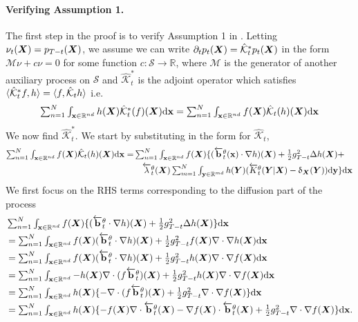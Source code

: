 \paragraph{Verifying Assumption 1.} The first step in the proof is to verify Assumption 1 in
\cite{benton2022denoising}. Letting $\nu_t({\bm{X}}) = p_{T-t}({\bm{X}})$, we assume we can
write $\partial_t p_t ({\bm{X}}) = \hat{\mathcal{K}}_t^* p_t({\bm{X}})$ in the form
$\mathcal{M}\nu + c \nu = 0$ for some function
$c : \mathcal{S} \rightarrow \mathbb{R}$, where $\mathcal{M}$ is the generator
of another auxiliary process on $\mathcal{S}$ and $\hat{\mathcal{K}}_t^*$ is the
adjoint operator which satisfies
$\langle \hat{\mathcal{K}}^*_t f, h \rangle = \langle f, \hat{\mathcal{K}}_t h \rangle$ i.e.
\begin{equation}
  \textstyle   \sum_{n=1}^N \int_{{\mathbf{x}} \in \mathbb{R}^{nd}} h({\bm{X}}) \hat{\mathcal{K}}_t^*(f)({\bm{X}}) \mathrm{d} {\mathbf{x}} = \sum_{n=1}^N \int_{{\mathbf{x}} \in \mathbb{R}^{nd}} f({\bm{X}}) \hat{\mathcal{K}}_t(h)({\bm{X}}) \mathrm{d} {\mathbf{x}}
\end{equation}
We now find $\hat{\mathcal{K}}_t^*$. We start by substituting in the form for $\hat{\mathcal{K}}_t$,
\begin{align}
    \textstyle \sum_{n=1}^N \int_{{\mathbf{x}} \in \mathbb{R}^{nd}} f({\bm{X}}) \hat{\mathcal{K}}_t(h)({\bm{X}}) \mathrm{d} {\mathbf{x}} =&\textstyle \sum_{n=1}^N \int_{{\mathbf{x}} \in \mathbb{R}^{nd}} f({\bm{X}}) \{ (\overleftarrow{\mathbf{b}}_t^\theta({\mathbf{x}}) \cdot \nabla h)({\bm{X}}) + \frac{1}{2} g_{T-t}^2 \Delta h ({\bm{X}}) + \\
    & \quad \textstyle \overleftarrow{\lambda}_t^\theta({\bm{X}}) \sum_{m=1}^N \int_{\mathbf{y} \in \mathbb{R}^{md}} h({\bm{Y}}) ( \overleftarrow{K}_t^\theta({\bm{Y}} | {\bm{X}}) - \updelta_{{\bm{X}}}({\bm{Y}}) ) \mathrm{d}\mathbf{y} \} \mathrm{d} {\mathbf{x}} 
\end{align}
We first focus on the RHS terms corresponding to the diffusion part of the process
\begin{align}
  &\textstyle \sum_{n=1}^N \int_{{\mathbf{x}} \in \mathbb{R}^{nd}} f({\bm{X}}) \{ (\overleftarrow{\mathbf{b}}_t^\theta \cdot \nabla h)({\bm{X}}) + \frac{1}{2} g_{T-t}^2 \Delta h ({\bm{X}}) \} \mathrm{d} {\mathbf{x}}\\
  &\textstyle = \sum_{n=1}^N \int_{{\mathbf{x}} \in \mathbb{R}^{nd}} f({\bm{X}}) (\overleftarrow{\mathbf{b}}_t^\theta \cdot \nabla h)({\bm{X}}) + \frac{1}{2} g_{T-t}^2 f({\bm{X}}) \nabla \cdot \nabla h ({\bm{X}}) \mathrm{d} {\mathbf{x}}\\
  &\textstyle = \sum_{n=1}^N \int_{{\mathbf{x}} \in \mathbb{R}^{nd}} f({\bm{X}}) (\overleftarrow{\mathbf{b}}_t^\theta \cdot \nabla h)({\bm{X}}) + \frac{1}{2} g_{T-t}^2 h({\bm{X}}) \nabla \cdot \nabla f ({\bm{X}}) \mathrm{d} {\mathbf{x}}\\
  &\textstyle = \sum_{n=1}^N \int_{{\mathbf{x}} \in \mathbb{R}^{nd}}  -h ({\bm{X}}) \nabla \cdot ( f \overleftarrow{\mathbf{b}}_t^\theta)({\bm{X}}) + \frac{1}{2} g_{T-t}^2 h({\bm{X}}) \nabla \cdot \nabla f ({\bm{X}}) \mathrm{d} {\mathbf{x}}\\
  &\textstyle = \sum_{n=1}^N \int_{{\mathbf{x}} \in \mathbb{R}^{nd}}  h ({\bm{X}}) \{ - \nabla \cdot ( f \overleftarrow{\mathbf{b}}_t^\theta)({\bm{X}}) + \frac{1}{2} g_{T-t}^2 \nabla \cdot \nabla f ({\bm{X}}) \} \mathrm{d} {\mathbf{x}}\\
  &\textstyle = \sum_{n=1}^N \int_{{\mathbf{x}} \in \mathbb{R}^{nd}}  h ({\bm{X}}) \{ -f({\bm{X}}) \nabla \cdot \overleftarrow{\mathbf{b}}_t^\theta({\bm{X}}) - \nabla f({\bm{X}}) \cdot \overleftarrow{\mathbf{b}}_t^\theta({\bm{X}}) + \frac{1}{2} g_{T-t}^2 \nabla \cdot \nabla f ({\bm{X}}) \} \mathrm{d} {\mathbf{x}} .
\end{align}

